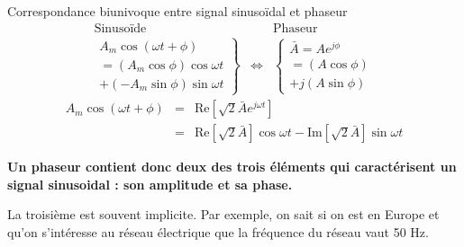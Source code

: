 \begin{frame}{\Large Correspondance biunivoque entre signal sinusoïdal et phaseur}
	\[
	\begin{array}{rcl}
	\text{Sinusoïde} & & \text{Phaseur}\\
	\left.\begin{array}{r}
	A_m\cos(\omega t+\phi)\\
	=(A_m\cos \phi)\cos \omega t \\
	+(-A_m\sin \phi)\sin \omega t
	\end{array}\right\} &
	\Leftrightarrow & 
	\left\{\begin{array}{l}
	\bar{A}=A e^{j\phi}\\
	= (A \cos \phi)\\
	+j(A \sin \phi)
	\end{array}\right.
	\end{array}\]
	\begin{eqnarray*}
		A_m\cos(\omega t + \phi) & = &\text{Re}[\sqrt{2} \bar A e^{j\omega t}]\\
		& = & \text{Re}[\sqrt{2}\bar A]\cos \omega t - \text{Im}[\sqrt{2}\bar A]\sin \omega t
	\end{eqnarray*}


\textbf{Un phaseur contient donc deux des trois éléments qui caractérisent un signal sinusoidal : son amplitude et sa phase. }

La troisième est souvent implicite. Par exemple, on sait si on est en Europe et qu'on s'intéresse au réseau électrique que la fréquence du réseau vaut 50 Hz.
	
	
\end{frame}


